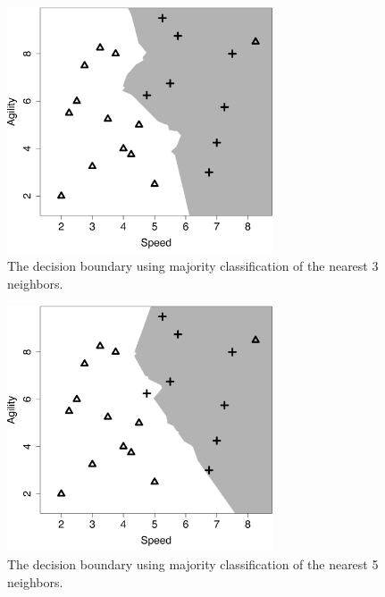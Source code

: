 \documentclass[xcolor={table}]{beamer}
\begin{document}
\begin{frame} 
\begin{figure}[htb]
	\begin{center}
	\includegraphics[width=0.7\textwidth]{./images/knn_fs_7_small.pdf}
	\end{center}
	\caption{The decision boundary using majority classification of the nearest 3 neighbors.}	
	\label{fig:knndecboundary3}
\end{figure}
\end{frame} 

\begin{frame} 
\begin{figure}[htb]
	\begin{center}
	\includegraphics[width=0.7\textwidth]{./images/knn_fs_8_small.pdf}
	\end{center}
	\caption{The decision boundary using majority classification of the nearest 5 neighbors.}	
	\label{fig:knndecboundary5}
\end{figure}
\end{frame} 
\end{document}
